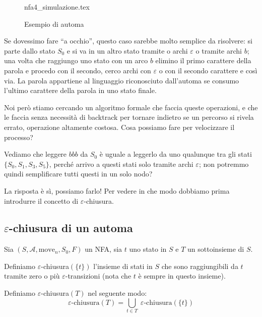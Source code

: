 \documentclass[class=book, crop=false, oneside, 12pt]{standalone}
\begin{document}
\begin{figure}
    \centering
    {nfa4_simulazione.tex}
    \caption{Esempio di automa}
    \label{automa_secondo_esempio}
\end{figure}

Se dovessimo fare “a occhio”, questo caso sarebbe molto semplice da risolvere: si parte dallo stato \(S_0\) e si va in un altro stato tramite o archi \(\varepsilon\) o tramite archi \(b\); una volta che raggiungo uno stato con un arco \(b\) elimino il primo carattere della parola e procedo con il secondo, cerco archi con \(\varepsilon\) o con il secondo carattere e così via.
La parola appartiene al linguaggio riconosciuto dall’automa se consumo l’ultimo carattere della parola in uno stato finale.

Noi però stiamo cercando un algoritmo formale che faccia queste operazioni, e che le faccia senza necessità di backtrack per tornare indietro se un percorso si rivela errato, operazione altamente costosa.
Cosa possiamo fare per velocizzare il processo?

Vediamo che leggere \(bbb\) da \(S_0\) è uguale a leggerlo da uno qualunque tra gli stati \(\{S_0, S_1, S_3, S_5\}\), perché arrivo a questi stati solo tramite archi \(\varepsilon\); non potremmo quindi semplificare tutti questi in un solo nodo?

La risposta è sì, possiamo farlo! Per vedere in che modo dobbiamo prima introdurre il concetto di \(\varepsilon\)-chiusura.


\subsection{\texorpdfstring{$\varepsilon$}{Epsilon}-chiusura di un automa}
Sia \((S, \mathcal{A}, \textrm{move}_n, S_0, F)\) un NFA, sia \(t\) uno stato in \(S\) e \(T\) un sottoinsieme di \(S\).

Definiamo \(\varepsilon\)-chiusura\((\{t\})\) l’insieme di stati in \(S\) che sono raggiungibili da \(t\) tramite zero o più \(\varepsilon\)-transizioni (nota che \(t\) è sempre in questo insieme).

Definiamo \(\varepsilon\)-chiusura\((T)\) nel seguente modo:
\begin{equation}
    \varepsilon \textrm{-chiusura}(T) = \bigcup_{t \in T} \;\varepsilon\textrm{-chiusura}(\{t\})
\end{equation} 
\end{document}
